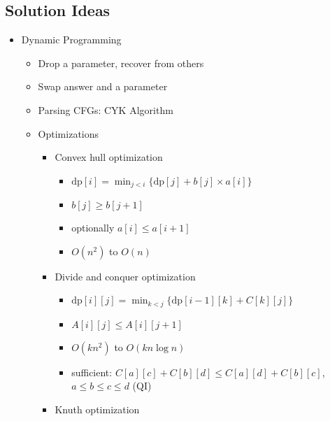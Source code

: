 \documentclass[9pt,a4paper,twocolumn,landscape,oneside]{amsart}
\newenvironment{myitemize}
{ \begin{itemize}[leftmargin=.5cm]
    \setlength{\itemsep}{0pt}
    \setlength{\parskip}{0pt}
    \setlength{\parsep}{0pt}     }
{ \end{itemize}                  }
\begin{document}
\begin{multicols*}{3}
        \subsection{Solution Ideas}
            \begin{myitemize}
                \item Dynamic Programming
                    \begin{itemize}
                        \item Drop a parameter, recover from others
                        \item Swap answer and a parameter
                        \item Parsing CFGs: CYK Algorithm
                        \item Optimizations
                            \begin{itemize}
                                \item Convex hull optimization
                                    \begin{itemize}
                                        \item $\mathrm{dp}[i] = \min_{j<i}\{\mathrm{dp}[j] + b[j] \times a[i]\}$
                                        \item $b[j] \geq b[j+1]$
                                        \item optionally $a[i] \leq a[i+1]$
                                        \item $O(n^2)$ to $O(n)$
                                    \end{itemize}
                                \item Divide and conquer optimization
                                    \begin{itemize}
                                        \item $\mathrm{dp}[i][j] = \min_{k<j}\{\mathrm{dp}[i-1][k] + C[k][j]\}$
                                        \item $A[i][j] \leq A[i][j+1]$
                                        \item $O(kn^2)$ to $O(kn\log{n})$
                                        \item sufficient: $C[a][c] + C[b][d] \leq C[a][d] + C[b][c]$, $a\leq b\leq c\leq d$ (QI)
                                    \end{itemize}
                                \item Knuth optimization
                                    \begin{itemize}

\end{itemize}
\end{itemize}
\end{itemize}
\end{myitemize}
\end{multicols*}
\end{document}
